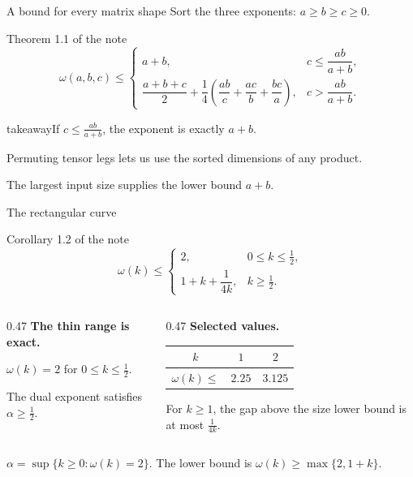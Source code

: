 \documentclass[aspectratio=169,11pt]{beamer}
\newcommand{\source}[1]{\vfill\par{\fontsize{7.5}{9}\selectfont\color{muted}#1\par}}
\newcommand{\takeaway}[1]{\begin{beamercolorbox}[sep=0.65em,wd=\linewidth]{takeaway}#1\end{beamercolorbox}}
\begin{document}
\begin{frame}{A bound for every matrix shape}
  Sort the three exponents: $a\ge b\ge c\ge0$.
  \begin{block}{Theorem 1.1 of the note}
  \[
    \omega(a,b,c)\le
    \begin{cases}
      a+b,&c\le\dfrac{ab}{a+b},\\[5pt]
      \dfrac{a+b+c}{2}
      +\dfrac{1}{4}\!\left(\dfrac{ab}{c}+\dfrac{ac}{b}+\dfrac{bc}{a}\right),
      &c>\dfrac{ab}{a+b}.
    \end{cases}
  \]
  \end{block}
  \medskip
  \takeaway{If $c\le\frac{ab}{a+b}$, the exponent is exactly $a+b$.}
  \medskip
  Permuting tensor legs lets us use the sorted dimensions of any product.
  \source{The largest input size supplies the lower bound $a+b$.}
\end{frame}

\begin{frame}{The rectangular curve}
  \begin{block}{Corollary 1.2 of the note}
  \[
    \omega(k)\le
    \begin{cases}
      2,&0\le k\le\frac{1}{2},\\[3pt]
      1+k+\dfrac{1}{4k},&k\ge\frac{1}{2}.
    \end{cases}
  \]
  \end{block}
  \vspace{2mm}
  \begin{columns}[T,onlytextwidth]
    \begin{column}{0.47\textwidth}
      \textbf{The thin range is exact.}\par\medskip
      $\omega(k)=2$ for $0\le k\le\frac{1}{2}$.\par\medskip
      The dual exponent satisfies $\alpha\ge\frac{1}{2}$.
    \end{column}
    \begin{column}{0.47\textwidth}
      \textbf{Selected values.}\par\medskip
      \begin{tabular}{@{}ccc@{}}
      $k$ & $1$ & $2$\\
      \midrule
      $\omega(k)\le$ & $2.25$ & $3.125$
      \end{tabular}\par\medskip
      For $k\ge1$, the gap above the size lower bound is at most $\frac{1}{4k}$.
    \end{column}
  \end{columns}
  \source{$\alpha=\sup\{k\ge0:\omega(k)=2\}$.
  The lower bound is $\omega(k)\ge\max\{2,1+k\}$.}
\end{frame}
\end{document}
